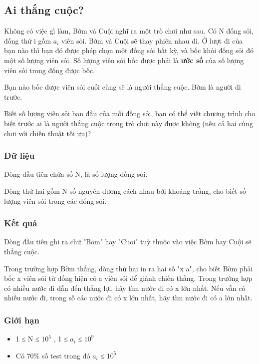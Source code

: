 







\subsection{   Ai thắng cuộc?  }

   Không có việc gì làm, Bờm và Cuội nghĩ ra một trò chơi như sau. Có N đống sỏi, đống thứ i gồm $a_{i}$   viên sỏi. Bờm và Cuội sẽ thay phiên nhau đi. Ở lượt đi của bạn nào thì bạn đó được phép chọn một đống sỏi bất kỳ, và bốc  khỏi đống sỏi đó một số lượng viên sỏi. Số lượng viên sỏi bốc được phải là   \textbf{    ước số   }   của số lượng viên sỏi trong đống được bốc.  

   Bạn nào bốc được viên sỏi cuối cùng sẽ là người thắng cuộc. Bờm là người đi trước.  

   Biết số lượng viên sỏi ban đầu của mỗi đống sỏi, bạn có thể viết chương trình cho biết trước ai là người thắng cuộc trong trò chơi này được không (nếu cả hai cùng chơi với chiến thuật tối ưu)?  

\subsubsection{   Dữ liệu  }

   Dòng đầu tiên chứa số N, là số lượng đống sỏi.  

   Dòng thứ hai gồm N số nguyên dương cách nhau bởi khoảng trắng, cho biết số lượng viên sỏi trong các đống sỏi.  

\subsubsection{   Kết quả  }

   Dòng đầu tiên ghi ra chữ "Bom" hay "Cuoi" tuỳ thuộc vào việc Bờm hay Cuội sẽ thắng cuộc.  

   Trong trường hợp Bờm thắng, dòng thứ hai in ra hai số "x a", cho biết Bờm phải bốc x viên sỏi từ đống hiện có a viên sỏi để giành chiến thắng. Trong trường hợp có nhiều nước đi dẫn đến thắng lợi, hãy tìm nước đi có x lớn nhất. Nếu vẫn có nhiều nước đi, trong số các nước đi có x lớn nhất, hãy tìm nước đi có a lớn nhất.  

\subsubsection{   Giới hạn  }
\begin{itemize}
	\item     1 ≤ N ≤ $10^{5}$    , 1 ≤ $a_{i}$    ≤ $10^{9}$
	\item     Có 70\% số test trong đó $a_{i}$    ≤ $10^{5}$
\end{itemize}

